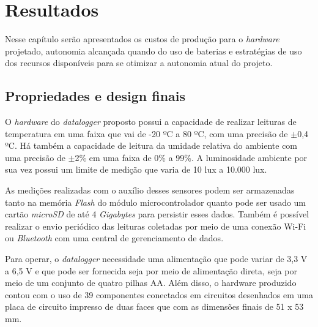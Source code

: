 \chapter{Resultados}
\label{chap:resultados}

Nesse capítulo serão apresentados os custos de produção para o \textit{hardware} projetado, autonomia alcançada quando do uso de baterias e estratégias de uso dos recursos disponíveis para se otimizar a autonomia atual do projeto.


\section{Propriedades e design finais}

O \textit{hardware} do \textit{datalogger} proposto possui a capacidade de realizar leituras de temperatura em uma faixa que vai de -20 ºC a 80 ºC, com uma precisão de $\pm$0,4 ºC. Há também a capacidade de leitura da umidade relativa do ambiente com uma precisão de $\pm$2\% em uma faixa de 0\% a 99\%. A luminosidade ambiente por sua vez possui um limite de medição que varia de 10 lux a 10.000 lux. 

As medições realizadas com o auxílio desses sensores podem ser armazenadas tanto na memória \textit{Flash} do módulo microcontrolador quanto pode ser usado um cartão \textit{microSD} de até 4 \textit{Gigabytes} para persistir esses dados. Também é possível realizar o envio periódico das leituras coletadas por meio de uma conexão Wi-Fi ou \textit{Bluetooth} com uma central de gerenciamento de dados. 

Para operar, o \textit{datalogger} necessidade uma alimentação que pode variar de 3,3 V a 6,5 V e que pode ser fornecida seja por meio de alimentação direta, seja por meio de um conjunto de quatro pilhas AA. Além disso, o hardware produzido contou com o uso de 39 componentes conectados em circuitos desenhados em uma placa de circuito impresso de duas faces que com as dimensões finais de 51 x 53 mm. 

    \begin{figure}[h!]
            \captionsetup{width=10cm}
   \end{figure}





